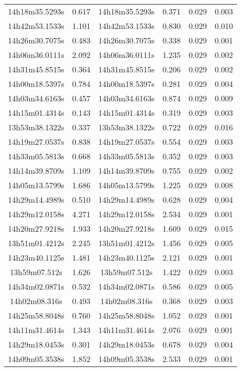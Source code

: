 \begin{table}
\begin{tabular}{cccccc}
14h18m35.5293s & 0.617 & 14h18m35.5293s & 0.371 & 0.029 & 0.003 \\
14h42m53.1533s & 1.101 & 14h42m53.1533s & 0.830 & 0.029 & 0.010 \\
14h26m30.7075s & 0.483 & 14h26m30.7075s & 0.338 & 0.029 & 0.001 \\
14h06m36.0111s & 2.092 & 14h06m36.0111s & 1.235 & 0.029 & 0.002 \\
14h31m45.8515s & 0.364 & 14h31m45.8515s & 0.206 & 0.029 & 0.002 \\
14h00m18.5397s & 0.784 & 14h00m18.5397s & 0.281 & 0.029 & 0.004 \\
14h03m34.6163s & 0.457 & 14h03m34.6163s & 0.874 & 0.029 & 0.009 \\
14h15m01.4314s & 0.143 & 14h15m01.4314s & 0.319 & 0.029 & 0.003 \\
13h53m38.1322s & 0.337 & 13h53m38.1322s & 0.722 & 0.029 & 0.016 \\
14h19m27.0537s & 0.838 & 14h19m27.0537s & 0.554 & 0.029 & 0.003 \\
14h33m05.5813s & 0.668 & 14h33m05.5813s & 0.352 & 0.029 & 0.003 \\
14h14m39.8709s & 1.109 & 14h14m39.8709s & 0.755 & 0.029 & 0.002 \\
14h05m13.5799s & 1.686 & 14h05m13.5799s & 1.225 & 0.029 & 0.008 \\
14h29m14.4989s & 0.510 & 14h29m14.4989s & 0.628 & 0.029 & 0.004 \\
14h29m12.0158s & 4.271 & 14h29m12.0158s & 2.534 & 0.029 & 0.001 \\
14h20m27.9218s & 1.933 & 14h20m27.9218s & 1.609 & 0.029 & 0.015 \\
13h51m01.4212s & 2.245 & 13h51m01.4212s & 1.456 & 0.029 & 0.005 \\
14h23m40.1125s & 1.481 & 14h23m40.1125s & 2.121 & 0.029 & 0.001 \\
13h59m07.512s & 1.626 & 13h59m07.512s & 1.422 & 0.029 & 0.003 \\
14h34m02.0871s & 0.532 & 14h34m02.0871s & 0.586 & 0.029 & 0.005 \\
14h02m08.316s & 0.493 & 14h02m08.316s & 0.368 & 0.029 & 0.003 \\
14h25m58.8048s & 0.760 & 14h25m58.8048s & 1.052 & 0.029 & 0.001 \\
14h11m31.4614s & 1.343 & 14h11m31.4614s & 2.076 & 0.029 & 0.001 \\
14h29m18.0453s & 0.301 & 14h29m18.0453s & 0.678 & 0.029 & 0.004 \\
14h09m05.3538s & 1.852 & 14h09m05.3538s & 2.533 & 0.029 & 0.001 \\

\end{tabular}
\end{table}
